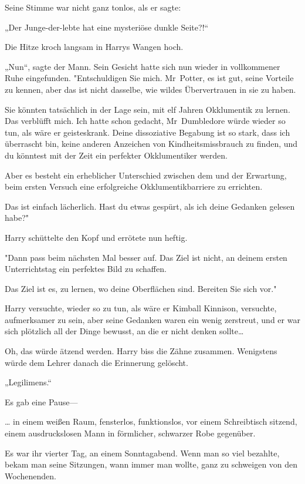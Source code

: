{Seine Stimme war nicht ganz tonlos, als er sagte:

„Der Junge-der-lebte hat eine mysteriöse dunkle Seite?!“

Die Hitze kroch langsam in Harrys Wangen hoch.

„Nun“, sagte der Mann. Sein Gesicht hatte sich nun wieder in vollkommener Ruhe eingefunden. "Entschuldigen Sie mich. Mr~Potter, es ist gut, seine Vorteile zu kennen, aber das ist nicht dasselbe, wie wildes Übervertrauen in sie zu haben.

Sie könnten tatsächlich in der Lage sein, mit elf Jahren Okklumentik zu lernen. Das verblüfft mich. Ich hatte schon gedacht, Mr~Dumbledore würde wieder so tun, als wäre er geisteskrank. Deine dissoziative Begabung ist so stark, dass ich überrascht bin, keine anderen Anzeichen von Kindheitsmissbrauch zu finden, und du könntest mit der Zeit ein perfekter Okklumentiker werden.

Aber es besteht ein erheblicher Unterschied zwischen dem und der Erwartung, beim ersten Versuch eine erfolgreiche Okklumentikbarriere zu errichten.

Das ist einfach lächerlich. Hast du etwas gespürt, als ich deine Gedanken gelesen habe?"

Harry schüttelte den Kopf und errötete nun heftig.

"Dann pass beim nächsten Mal besser auf. Das Ziel ist nicht, an deinem ersten Unterrichtstag ein perfektes Bild zu schaffen.

Das Ziel ist es, zu lernen, wo deine Oberflächen sind. Bereiten Sie sich vor."

Harry versuchte, wieder so zu tun, als wäre er Kimball Kinnison, versuchte, aufmerksamer zu sein, aber seine Gedanken waren ein wenig zerstreut, und er war sich plötzlich all der Dinge bewusst, an die er nicht denken sollte…

Oh, das würde ätzend werden. Harry biss die Zähne zusammen. Wenigstens würde dem Lehrer danach die Erinnerung gelöscht.

„Legilimens.“

Es gab eine Pause—

… in einem weißen Raum, fensterlos, funktionslos, vor einem Schreibtisch sitzend, einem ausdruckslosen Mann in förmlicher, schwarzer Robe gegenüber.

Es war ihr vierter Tag, an einem Sonntagabend. Wenn man so viel bezahlte, bekam man seine Sitzungen, wann immer man wollte, ganz zu schweigen von den Wochenenden.

}
